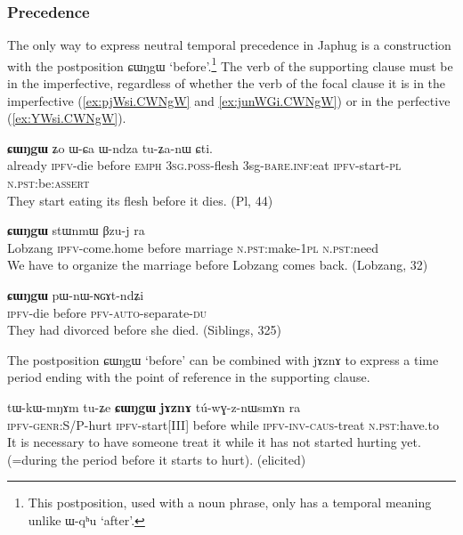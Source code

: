 \documentclass[oldfontcommands,oneside,a4paper,11pt]{article}
\newcommand{\ipa}[1]{{\phon \mbox{#1}}} %
\begin{document}
\subsubsection{Precedence} \label{sec:precedence}
The only way to express neutral temporal precedence  in Japhug  is a construction with the postposition  \ipa{ɕɯŋgɯ} `before'.\footnote{This postposition, used with a noun phrase, only has a temporal meaning unlike \ipa{ɯ-qʰu} `after'.} The verb of the supporting clause must be in the imperfective, regardless of whether the verb of the focal clause it is in the imperfective  (\ref{ex:pjWsi.CWNgW} and \ref{ex:junWGi.CWNgW}) or in the perfective   (\ref{ex:YWsi.CWNgW}).

\begin{exe}
\ex \label{ex:pjWsi.CWNgW}
\gll [\ipa{pɤjkʰu}  	\ipa{pjɯ-si}]  	\textbf{\ipa{ɕɯŋgɯ}}  	\ipa{ʑo}  	\ipa{ɯ-ɕa}  	\ipa{ɯ-ndza}  	\ipa{tu-ʑa-nɯ}  	\ipa{ɕti.}  \\
already \textsc{ipfv}-die before \textsc{emph} \textsc{3sg.poss}-flesh 3sg-\textsc{bare.inf}:eat \textsc{ipfv}-start-\textsc{pl} \textsc{n.pst}:be:\textsc{assert} \\
\glt They start eating its flesh before it dies. (Pl, 44)
\end{exe}

\begin{exe}
\ex \label{ex:junWGi.CWNgW}
\gll
[\ipa{lɤβzaŋ}  	\ipa{ju-nɯɣi}]  	\textbf{\ipa{ɕɯŋgɯ}}  	\ipa{stɯnmɯ}  	\ipa{βzu-j}  	\ipa{ra}  \\
Lobzang \textsc{ipfv}-come.home before marriage \textsc{n.pst}:make-\textsc{1pl} \textsc{n.pst}:need \\
\glt We have to organize the marriage before Lobzang comes back. (Lobzang, 32)
\end{exe}

\begin{exe}
\ex \label{ex:YWsi.CWNgW}
\gll
[\ipa{ɲɯ-si}]  	\textbf{\ipa{ɕɯŋgɯ}}  	\ipa{pɯ-nɯ-ɴɢɤt-ndʑi}  \\
\textsc{ipfv}-die before \textsc{pfv-auto}-separate-\textsc{du} \\
\glt They had divorced before she died. (Siblings, 325)
\end{exe}

The postposition \ipa{ɕɯŋgɯ} `before' can be combined with  \ipa{jɤznɤ} to express a time period ending with the point of reference in the supporting clause.

\begin{exe}
\ex \label{ex:CWNgW.jAZnA}
\gll
\ipa{tɯ-kɯ-mŋɤm}  	\ipa{tu-ʑe}  	\ipa{\textbf{ɕɯŋgɯ}}  	\ipa{\textbf{jɤznɤ}}  	\ipa{tú-wɣ-z-nɯsmɤn}  	\ipa{ra}  \\
\textsc{ipfv-genr}:S/P-hurt \textsc{ipfv}-start[III] before while \textsc{ipfv-inv-caus}-treat \textsc{n.pst}:have.to \\
\glt It is necessary to have someone treat it while it has not started hurting yet. (=during the period before it starts to hurt). (elicited)
\end{exe}
 
\end{document}
